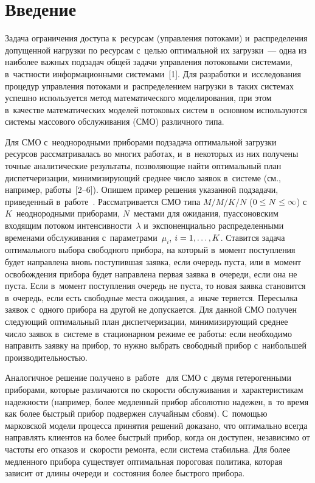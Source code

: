 \begin{multicols}{2}

\label{st\stat}

\section{Введение}

 Задача ограничения доступа к~ресурсам (управ\-ле\-ния потоками)
и~распределения допущенной нагрузки по ресурсам с~целью оптимальной их
загрузки~--- одна из наиболее важных подзадач общей задачи управления
потоковыми системами, в~частности информационными системами~[1]. Для
разработки и~исследования процедур управления потоками и~распределением
нагрузки в~таких системах успешно используется метод математического
моделирования, при этом в~качестве математических моделей потоковых
систем в~основном используются системы массового обслуживания (СМО)
различного типа.

Для СМО с~неоднородными приборами под\-задача оптимальной загрузки
ресурсов рассматривалась во многих работах, и~в~некоторых из них \mbox{получены}
точные аналитические результаты, позволяющие найти оптимальный план
диспетчеризации, минимизирующий среднее чис\-ло заявок в~системе (см.,
например, работы~[2--6]). Опишем пример решения указанной подзадачи,
приведенный в~работе~\cite{2-ag}. Рассматривается СМО типа $M/M/K/N$
($0\hm\leq N\hm\leq \infty$) с~$K$~неоднородными приборами, $N$~местами
для ожидания, пуассоновским входящим потоком интенсивности~$\lambda$
и~экспоненциально распределенными временами обслуживания
с~параметрами~$\mu_i$, $i\hm=1,\ldots , K$. Ставится задача оптимального
выбора свободного прибора, на который в~момент поступления будет
направлена вновь поступившая заявка, если очередь пуста, или в~момент
освобождения прибора будет направлена первая заявка в~очереди, если она не
пуста. Если в~момент поступления очередь не пуста, то новая заявка
становится в~очередь, если есть свободные места ожидания, а~иначе теряется.
Пересылка заявок с~одного прибора на другой не допускается. Для данной
СМО получен следующий оптимальный план диспетчеризации,
минимизирующий среднее чис\-ло заявок в~системе в~стационарном режиме ее
работы: если необходимо направить заявку на прибор, то нужно выбрать
свободный прибор с~наибольшей производительностью. 

Аналогичное решение
получено в~работе~\cite{6-ag} для СМО с~двумя гетерогенными приборами,
которые различаются по скорости обслуживания и~характеристикам
надежности (например, более медленный прибор абсолютно надежен, в~то
время как более быстрый прибор подвержен случайным сбоям). С~по\-мощью
марковской модели процесса принятия решений доказано, что оптимально
всегда направлять клиентов на более быстрый прибор, когда он доступен,
независимо от частоты его отказов и~скорости ремонта, если система
стабильна. Для более медленного прибора существует оптимальная пороговая
политика, которая зависит от длины очереди и~состояния более быстрого
прибора. 


\end{multicols}
